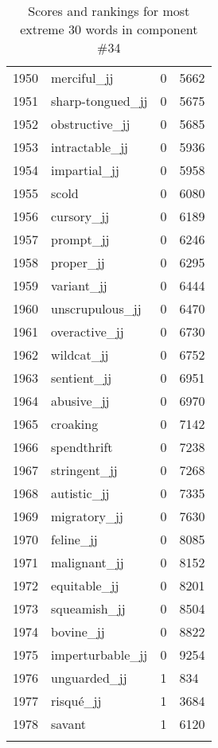 \begin{longtable}[!htbp]{| rlr@{.}l |}
    1950 & merciful\_jj & 0 & 5662 \\
    1951 & sharp-tongued\_jj & 0 & 5675 \\
    1952 & obstructive\_jj & 0 & 5685 \\
    1953 & intractable\_jj & 0 & 5936 \\
    1954 & impartial\_jj & 0 & 5958 \\
    1955 & scold & 0 & 6080 \\
    1956 & cursory\_jj & 0 & 6189 \\
    1957 & prompt\_jj & 0 & 6246 \\
    1958 & proper\_jj & 0 & 6295 \\
    1959 & variant\_jj & 0 & 6444 \\
    1960 & unscrupulous\_jj & 0 & 6470 \\
    1961 & overactive\_jj & 0 & 6730 \\
    1962 & wildcat\_jj & 0 & 6752 \\
    1963 & sentient\_jj & 0 & 6951 \\
    1964 & abusive\_jj & 0 & 6970 \\
    1965 & croaking & 0 & 7142 \\
    1966 & spendthrift & 0 & 7238 \\
    1967 & stringent\_jj & 0 & 7268 \\
    1968 & autistic\_jj & 0 & 7335 \\
    1969 & migratory\_jj & 0 & 7630 \\
    1970 & feline\_jj & 0 & 8085 \\
    1971 & malignant\_jj & 0 & 8152 \\
    1972 & equitable\_jj & 0 & 8201 \\
    1973 & squeamish\_jj & 0 & 8504 \\
    1974 & bovine\_jj & 0 & 8822 \\
    1975 & imperturbable\_jj & 0 & 9254 \\
    1976 & unguarded\_jj & 1 & 834 \\
    1977 & risqué\_jj & 1 & 3684 \\
    1978 & savant & 1 & 6120 \\
    \hline
    \caption{Scores and rankings for most extreme 30 words in component \#34} \\
\end{longtable}
